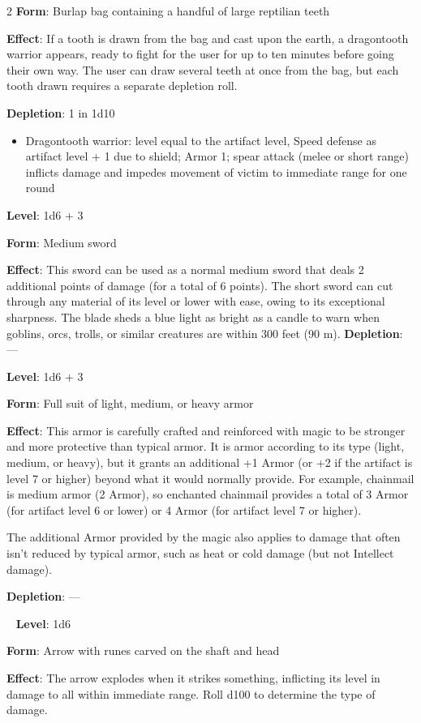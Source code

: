 \begin{multicols}{2}
\textbf{Form}: Burlap bag containing a handful of large reptilian teeth

\textbf{Effect}: If a tooth is drawn from the bag and cast upon the earth, a dragontooth warrior appears, ready to fight for the user for up to ten minutes before going their own way. The user can draw several teeth at once from the bag, but each tooth drawn requires a separate depletion roll. 

\textbf{Depletion}: 1 in 1d10 

\begin{itemize}
\item Dragontooth warrior: level equal to the artifact level, Speed defense as artifact level + 1 due to shield; Armor 1; spear attack (melee or short range) inflicts damage and impedes movement of victim to immediate range for one round
\end{itemize}


\textbf{Level}: 1d6 + 3 

\textbf{Form}: Medium sword

\textbf{Effect}: This sword can be used as a normal medium sword that deals 2 additional points of damage (for a total of 6 points). The short sword can cut through any material of its level or lower with ease, owing to its exceptional sharpness. The blade sheds a blue light as bright as a candle to warn when goblins, orcs, trolls, or similar creatures are within 300 feet (90 m). \textbf{Depletion}: — 


\textbf{Level}: 1d6 + 3 

\textbf{Form}: Full suit of light, medium, or heavy armor 

\textbf{Effect}: This armor is carefully crafted and reinforced with magic to be stronger and more protective than typical armor. It is armor according to its type (light, medium, or heavy), but it grants an additional +1 Armor (or +2 if the artifact is level 7 or higher) beyond what it would normally provide. For example, chainmail is medium armor (2 Armor), so enchanted chainmail provides a total of 3 Armor (for artifact level 6 or lower) or 4 Armor (for artifact level 7 or higher). 

The additional Armor provided by the magic also applies to damage that often isn’t reduced by typical armor, such as heat or cold damage (but not Intellect damage). 

\textbf{Depletion}: —

 
\textbf{Level}: 1d6 

\textbf{Form}: Arrow with runes carved on the shaft and head 

\textbf{Effect}: The arrow explodes when it strikes something, inflicting its level in damage to all within immediate range. Roll d100 to determine the type of damage.

\end{multicols}

